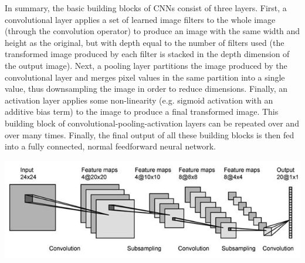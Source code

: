 \documentclass{article}
\begin{document}
In summary, the basic building blocks of CNNs consist of three layers. First, a convolutional layer applies a set of learned image filters to the whole image (through the convolution operator) to produce an image with the same width and height as the original, but with depth equal to the number of filters used (the transformed image produced by each filter is stacked in the depth dimension of the output image). Next, a pooling layer partitions the image produced by the convolutional layer and merges pixel values in the same partition into a single value, thus downsampling the image in order to reduce dimensions. Finally, an activation layer applies some non-linearity (e.g. sigmoid activation with an additive bias term) to the image to produce a final transformed image. This building block of convolutional-pooling-activation layers can be repeated over and over many times. Finally, the final output of all these building blocks is then fed into a fully connected, normal feedforward neural network.

\begin{center}
    \includegraphics[scale=0.5]{images/conv_net.png}
\end{center}
\end{document}
